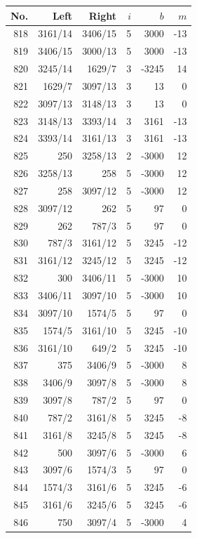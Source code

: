 \documentclass[11pt,a4paper]{article}
\begin{document}
\begin{minipage}[t]{.49\linewidth}\centering\footnotesize\setlength{\tabcolsep}{2pt}\renewcommand{\arraystretch}{1.09}
\begin{tabular*}{\linewidth}{@{}r@{\extracolsep{\fill}}rrrrr@{}}\toprule
No. & Left & Right & $i$ & $b$ & $m$\\\midrule
818 & 3161/14 & 3406/15 & 5 & 3000 & -13\\
819 & 3406/15 & 3000/13 & 5 & 3000 & -13\\
820 & 3245/14 & 1629/7 & 3 & -3245 & 14\\
821 & 1629/7 & 3097/13 & 3 & 13 & 0\\
822 & 3097/13 & 3148/13 & 3 & 13 & 0\\
823 & 3148/13 & 3393/14 & 3 & 3161 & -13\\
824 & 3393/14 & 3161/13 & 3 & 3161 & -13\\
825 & 250 & 3258/13 & 2 & -3000 & 12\\
826 & 3258/13 & 258 & 5 & -3000 & 12\\
827 & 258 & 3097/12 & 5 & -3000 & 12\\
828 & 3097/12 & 262 & 5 & 97 & 0\\
829 & 262 & 787/3 & 5 & 97 & 0\\
830 & 787/3 & 3161/12 & 5 & 3245 & -12\\
831 & 3161/12 & 3245/12 & 5 & 3245 & -12\\
832 & 300 & 3406/11 & 5 & -3000 & 10\\
833 & 3406/11 & 3097/10 & 5 & -3000 & 10\\
834 & 3097/10 & 1574/5 & 5 & 97 & 0\\
835 & 1574/5 & 3161/10 & 5 & 3245 & -10\\
836 & 3161/10 & 649/2 & 5 & 3245 & -10\\
837 & 375 & 3406/9 & 5 & -3000 & 8\\
838 & 3406/9 & 3097/8 & 5 & -3000 & 8\\
839 & 3097/8 & 787/2 & 5 & 97 & 0\\
840 & 787/2 & 3161/8 & 5 & 3245 & -8\\
841 & 3161/8 & 3245/8 & 5 & 3245 & -8\\
842 & 500 & 3097/6 & 5 & -3000 & 6\\
843 & 3097/6 & 1574/3 & 5 & 97 & 0\\
844 & 1574/3 & 3161/6 & 5 & 3245 & -6\\
845 & 3161/6 & 3245/6 & 5 & 3245 & -6\\
846 & 750 & 3097/4 & 5 & -3000 & 4\\

\end{tabular*}
\end{minipage}
\end{document}
